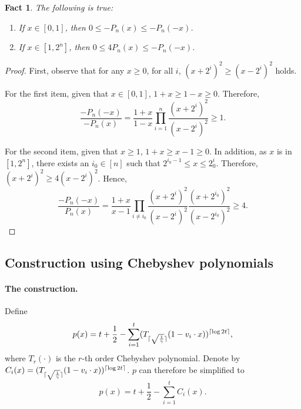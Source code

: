 \documentclass{article}
\DeclarePairedDelimiter\ceil{\lceil}{\rceil}
\newtheorem{fact}[theorem]{Fact}
\begin{document}
\begin{fact}
The following is true:
\begin{enumerate}
\item If $x \in [0,1]$, then $0 \leq -P_n(x) \leq -P_n(-x)$. \label{item:x-small}
\item If $x \in [1, 2^n]$, then $0 \leq 4P_n(x) \leq -P_n(-x)$. \label{item:x-large}
\end{enumerate}
\label{fact:pn}
\end{fact}
\begin{proof}
First, observe that for any $x \geq 0$, for all $i$, $(x+2^i)^2 \geq (x - 2^i)^2$ holds.

For the first item, given that $x \in [0,1]$, $1+x \geq 1-x \geq 0$. Therefore,
\[ \frac{-P_n(-x)}{-P_n(x)} = \frac{1+x}{1-x} \prod_{i =1}^n \frac{(x+2^i)^2}{(x - 2^i)^2}  \geq 1. \]

For the second item, given that $x \geq 1$, $1+x \geq x-1 \geq 0$. In addition, as $x$ is in $[1,2^n]$, there exists an $i_0 \in [n]$ such that $2^{i_0-1} \leq x \leq 2^i_0$. Therefore,
$(x+2^i)^2 \geq 4(x - 2^i)^2$. Hence,
\[ \frac{-P_n(-x)}{P_n(x)} = \frac{1+x}{ x-1} \prod_{i \neq i_0} \frac{(x+2^i)^2}{(x - 2^i)^2} \frac{(x+2^{i_0})^2}{(x - 2^{i_0})^2} \geq 4. \]

\end{proof}


\subsection{Construction using Chebyshev polynomials}
\paragraph{The construction.} Define
\[ p(x) = t + \frac 1 2 - \sum_{i=1}^t (T_{\ceil{\sqrt{\frac 1 \gamma}}}(1 - v_i \cdot x))^{\ceil{\log 2t}}, \]
where
$T_r(\cdot)$ is the $r$-th order Chebyshev polynomial. Denote by $C_i(x) = (T_{\ceil{\sqrt{\frac 1 \gamma}}}(1 - v_i \cdot x))^{\ceil{\log 2t}}$. $p$ can therefore be simplified to
\[ p(x) = t + \frac 1 2 - \sum_{i=1}^t C_i(x). \]
\end{document}
